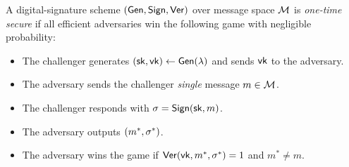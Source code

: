 \begin{definition}\label{def:sig-once}
A digital-signature scheme $(\mathsf{Gen}, \mathsf{Sign}, \mathsf{Ver})$ over message space $\mathcal{M}$ is \emph{one-time secure} if all efficient adversaries win
the following game with negligible probability:
  \begin{itemize}[noitemsep]
    \item The challenger generates $({\mathsf{sk}}, \mathsf{vk}) \leftarrow \mathsf{Gen}(\lambda)$ and sends $\mathsf{vk}$ to the adversary.
    \item The adversary sends the challenger \emph{single} message $m \in \mathcal{M}$.
    \item The challenger responds with $\sigma = \mathsf{Sign}({\mathsf{sk}}, m)$.
    \item The adversary outputs $(m^*, \sigma^*)$.
    \item The adversary wins the game if $\mathsf{Ver}(\mathsf{vk}, m^*, \sigma^*) = 1$ and $m^* \neq m$.
\end{itemize}
\end{definition}

